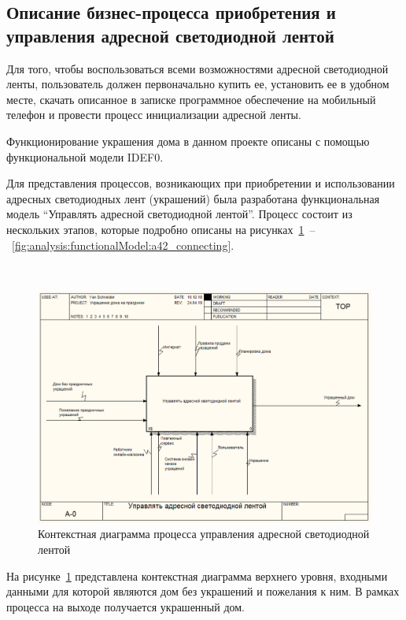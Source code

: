 \subsection{Описание бизнес-процесса приобретения и управления адресной светодиодной лентой}
\label{sec:analysis:businessProccess}

Для того, чтобы воспользоваться всеми возможностями адресной светодиодной ленты, пользователь должен первоначально купить ее, установить ее в удобном месте, скачать описанное в записке программное обеспечение на мобильный телефон и провести процесс инициализации адресной ленты.

Функционирование украшения дома в данном проекте описаны с помощью функциональной модели IDEF0.

Для представления процессов, возникающих при приобретении и использовании адресных светодиодных лент (украшений) была разработана функциональная модель \enquote{Управлять адресной светодиодной лентой}. Процесс состоит из нескольких этапов, которые подробно описаны на рисунках~\ref{fig:analysis:functionalModel:main}~–~\ref{fig:analysis:functionalModel:a42_connecting}.

~
\begin{figure}[H]
\centering
	\includegraphics[scale=0.45]{figures/functionalModel/main.png}
	\caption{Контекстная диаграмма процесса управления адресной светодиодной лентой}
	\label{fig:analysis:functionalModel:main}
\end{figure}

На рисунке~\ref{fig:analysis:functionalModel:main} представлена контекстная диаграмма верхнего уровня, входными данными для которой являются дом без украшений и пожелания к ним. В рамках процесса на выходе получается украшенный дом. 


